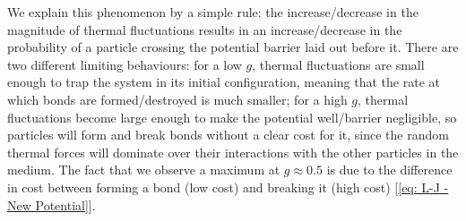 \documentclass[../../main.tex]{subfiles}
\begin{document}
    We explain this phenomenon by a simple rule: the increase/decrease in the magnitude of thermal fluctuations results in an increase/decrease in the probability of a particle crossing the potential barrier laid out before it. There are two different limiting behaviours: for a low $g$, thermal fluctuations are small enough to trap the system in its initial configuration, meaning that the rate at which bonds are formed/destroyed is much smaller; for a high $g$, thermal fluctuations become large enough to make the potential well/barrier negligible, so particles will form and break bonds without a clear cost for it, since the random thermal forces will dominate over their interactions with the other particles in the medium. The fact that we observe a maximum at $g \approx 0.5$ is due to the difference in cost between forming a bond (low cost) and breaking it (high cost) [\cref{eq: L-J - New Potential}].  
\end{document}
